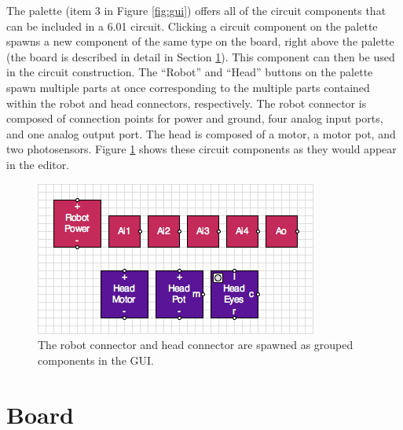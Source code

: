 The palette (item $3$ in Figure \ref{fig:gui}) offers all of the circuit
components that can be included in a 6.01 circuit.
Clicking a circuit component on
the palette spawns a new component of the same type on the board, right above
the palette (the board is described in detail in Section \ref{sec:board}).
This component can then be used in the circuit construction. The
``Robot'' and ``Head'' buttons on the palette spawn multiple parts at once
corresponding to the multiple parts contained within the robot and head
connectors, respectively. The robot connector is composed of connection points
for power and ground, four analog input ports, and one analog output port.
The head is composed of a motor, a motor pot, and
two photosensors. Figure \ref{fig:robot_head_parts} shows these
circuit components as they would appear in the editor.

\begin{figure}
\begin{center}
\includegraphics[scale=0.75]{Images/robot_head_parts.png}
\caption[Grouped components]{The robot connector and head connector are
spawned as grouped components in the GUI.}
\label{fig:robot_head_parts}
\end{center}
\end{figure}

\section{Board}
\label{sec:board}

